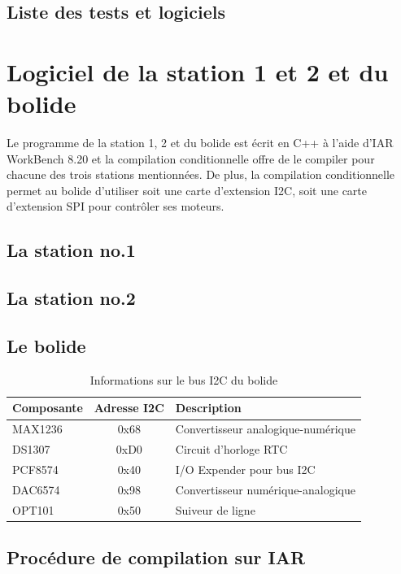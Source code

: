 \documentclass[10pt,a4paper,final]{article}
\begin{document}
\begin{spacing}{1.5}
\subsection{Liste des tests et logiciels}






\pagebreak
\section{Logiciel de la station 1 et 2 et du bolide}
Le programme de la station 1, 2 et du bolide est écrit en C++ à l'aide d'IAR WorkBench 8.20 et la compilation conditionnelle offre de le compiler pour chacune des trois stations mentionnées. De plus, la compilation conditionnelle permet au bolide d'utiliser soit une carte d'extension I2C, soit une carte d'extension SPI pour contrôler ses moteurs.

\subsection{La station no.1}

\subsection{La station no.2}

\subsection{Le bolide}
\begin{table}[!ht]
\centering
\begin{tabular}{|l|c|l|}
\hline 
\textbf{Composante} & \textbf{Adresse I{\small 2}C} & \textbf{Description} \\ 
\hline 
MAX1236 & 0x68 & Convertisseur analogique-numérique \\ 
\hline 
DS1307  & 0xD0 & Circuit d'horloge RTC \\ 
\hline 
PCF8574 & 0x40 & I/O Expender pour bus I{\small 2}C \\ 
\hline 
DAC6574 & 0x98  & Convertisseur numérique-analogique  \\ 
\hline 
OPT101  &  0x50 & Suiveur de ligne  \\ 
\hline 
\end{tabular} 
\caption{Informations sur le bus I{\small 2}C du bolide}
\label{tab:testtab1}
\end{table}

\subsection{Procédure de compilation sur IAR}


\end{spacing}
\end{document}
